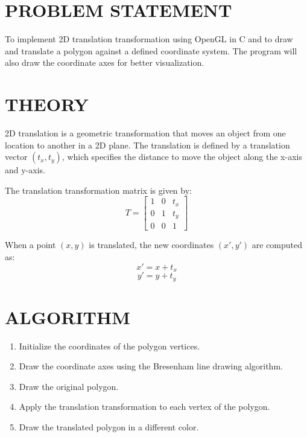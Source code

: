 \documentclass{article}
\begin{document}
\section*{PROBLEM STATEMENT}
To implement 2D translation transformation using OpenGL in C and to draw and translate a polygon against a defined coordinate system. The program will also draw the coordinate axes for better visualization.

\section*{THEORY}
2D translation is a geometric transformation that moves an object from one location to another in a 2D plane. The translation is defined by a translation vector \((t_x, t_y)\), which specifies the distance to move the object along the x-axis and y-axis.

The translation transformation matrix is given by:
\[
T = \begin{bmatrix}
1 & 0 & t_x \\
0 & 1 & t_y \\
0 & 0 & 1
\end{bmatrix}
\]

When a point \((x, y)\) is translated, the new coordinates \((x', y')\) are computed as:
\[
x' = x + t_x
\]
\[
y' = y + t_y
\]

\section*{ALGORITHM}

\begin{enumerate}
    \item Initialize the coordinates of the polygon vertices.
    \item Draw the coordinate axes using the Bresenham line drawing algorithm.
    \item Draw the original polygon.
    \item Apply the translation transformation to each vertex of the polygon.
    \item Draw the translated polygon in a different color.
\end{enumerate}
\end{document}
